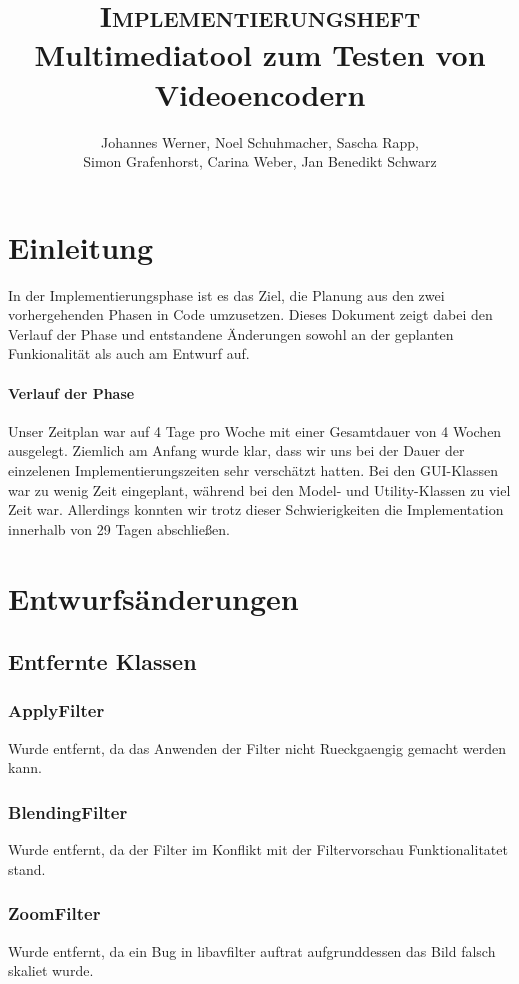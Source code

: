 \documentclass{scrartcl}
\title{\fontsize{40}{48} \selectfont \textsc{Implementierungsheft}\\
{\fontsize{18}{18} \selectfont Multimediatool zum Testen von Videoencodern}}
\author {Johannes Werner, Noel Schuhmacher, Sascha Rapp,\\ Simon Grafenhorst,
Carina Weber, Jan Benedikt Schwarz}
\begin{document}
 {
\pagestyle{empty}
\maketitle
\newpage
{}
\tableofcontents
\clearpage
\pagestyle{plain}
\newpage
\section{Einleitung}
In der Implementierungsphase ist es das Ziel, die Planung aus den zwei vorhergehenden Phasen in Code umzusetzen.  Dieses Dokument zeigt dabei den Verlauf der Phase und entstandene Änderungen sowohl an der geplanten Funkionalität als auch am Entwurf auf.

\paragraph{Verlauf der Phase} Unser Zeitplan war auf 4 Tage pro Woche mit einer Gesamtdauer von 4 Wochen ausgelegt. Ziemlich am Anfang wurde klar, dass wir uns bei der Dauer der einzelenen Implementierungszeiten sehr verschätzt hatten. Bei den GUI-Klassen war zu wenig Zeit eingeplant, während bei den Model- und Utility-Klassen zu viel Zeit war. Allerdings konnten wir trotz dieser Schwierigkeiten die Implementation innerhalb von 29 Tagen abschließen.
\newpage
\section{Entwurfsänderungen}
\subsection{Entfernte Klassen}
\subsubsection{ApplyFilter}
Wurde entfernt, da das Anwenden der Filter nicht Rueckgaengig gemacht werden kann.
\subsubsection{BlendingFilter}
Wurde entfernt, da der Filter im Konflikt mit der Filtervorschau Funktionalitatet stand.
\subsubsection{ZoomFilter}
Wurde entfernt, da ein Bug in libavfilter auftrat aufgrunddessen das Bild falsch skaliet wurde.
}
\end{document}
